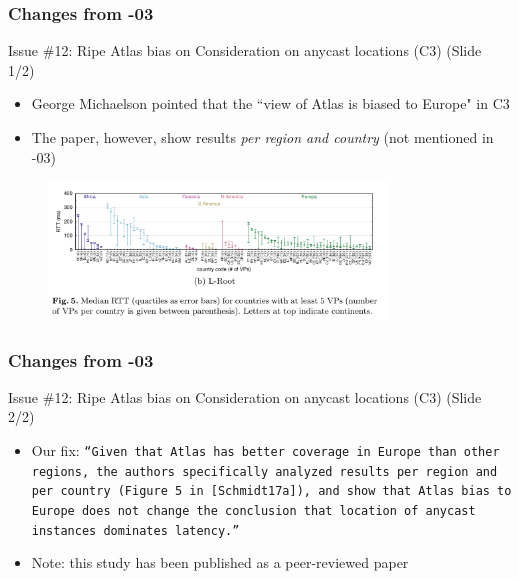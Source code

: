 \documentclass[11pt,show 
notes,notheorems,noamsthm,blank]{beamer} %
\begin{document}
\begin{frame}
\frametitle{Changes from -03}
\begin{block}{ Issue \#12: Ripe Atlas bias on Consideration on anycast
    locations (C3) (Slide 1/2)}
\begin{itemize}
\item George Michaelson pointed that the ``view of Atlas is biased to Europe" in C3
\item The paper, however, show results \textit{per region and country} (not mentioned in -03)



\end{itemize} 

\end{block}
\vspace{-0.5cm}

\begin{figure}
\centering
   \includegraphics[width= 9cm]{rtt-schmidt17a.png}
\end{figure}

\end{frame}

\begin{frame}
\frametitle{Changes from -03}
\begin{block}{ Issue \#12: Ripe Atlas bias on Consideration on anycast
    locations (C3) (Slide 2/2)}



\begin{itemize}
\item Our fix: \texttt{``Given that Atlas has better coverage in Europe than other regions, the authors specifically analyzed results per region and per country (Figure 5 in [Schmidt17a]), and show that Atlas bias to Europe does not change the conclusion that location of anycast instances dominates latency.''}

\item Note: this study has been published as a peer-reviewed paper
\end{itemize}

\end{block}
\end{frame}
\end{document}
